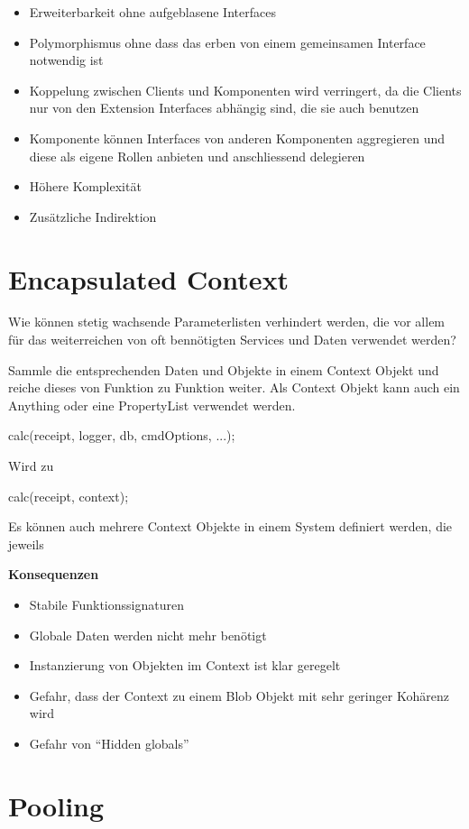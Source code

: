 \begin{itemize}
	\item Erweiterbarkeit ohne aufgeblasene Interfaces
	\item Polymorphismus ohne dass das erben von einem gemeinsamen Interface notwendig ist
	\item Koppelung zwischen Clients und Komponenten wird verringert, da die Clients nur von den Extension Interfaces abhängig sind, die sie auch benutzen
	\item Komponente können Interfaces von anderen Komponenten aggregieren und diese als eigene Rollen anbieten und anschliessend delegieren
	\item Höhere Komplexität
	\item Zusätzliche Indirektion
\end{itemize}

\section{Encapsulated Context}

Wie können stetig wachsende Parameterlisten verhindert werden, die vor allem für das weiterreichen von oft bennötigten Services und Daten verwendet werden?

Sammle die entsprechenden Daten und Objekte in einem Context Objekt und reiche dieses von Funktion zu Funktion weiter. Als Context Objekt kann auch ein Anything oder eine PropertyList verwendet werden.

calc(receipt, logger, db, cmdOptions, ...);

Wird zu

calc(receipt, context);

Es können auch mehrere Context Objekte in einem System definiert werden, die jeweils 

\textbf{Konsequenzen}

\begin{itemize}
	\item Stabile Funktionssignaturen
	\item Globale Daten werden nicht mehr benötigt
	\item Instanzierung von Objekten im Context ist klar geregelt
	\item Gefahr, dass der Context zu einem Blob Objekt mit sehr geringer Kohärenz wird
	\item Gefahr von ``Hidden globals''
\end{itemize}


\section{Pooling}

